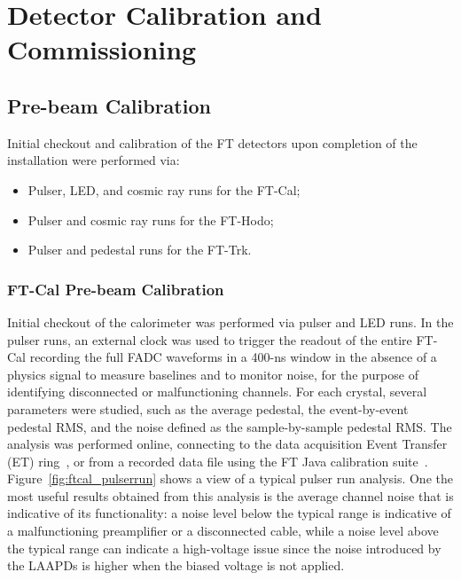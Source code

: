 \section{Detector Calibration and Commissioning}
\label{sec:calibration}

\subsection{Pre-beam Calibration}

Initial checkout and calibration of the FT detectors upon completion of the installation were performed via:
\begin{itemize}
    \item Pulser, LED, and cosmic ray runs for the FT-Cal;
    \item Pulser and cosmic ray runs for the FT-Hodo;
    \item Pulser and pedestal runs for the FT-Trk.
\end{itemize}

\subsubsection{FT-Cal Pre-beam Calibration}

Initial checkout of the calorimeter was performed via pulser and LED runs. In the pulser runs, an external clock was
used to trigger the readout of the entire FT-Cal recording the full FADC waveforms in a 400-ns window in the
absence of a physics signal to measure baselines and to monitor noise, for the purpose of identifying disconnected
or malfunctioning channels. For each crystal, several parameters were studied, such as the average pedestal, the
event-by-event pedestal RMS, and the noise defined as the sample-by-sample pedestal RMS. The analysis was
performed online, connecting to the data acquisition Event Transfer (ET) ring~\cite{daq}, or from a recorded
data file using the FT Java calibration suite~\cite{reconstruction}. Figure~\ref{fig:ftcal_pulserrun} shows a
view of a typical pulser run analysis. One the most useful results obtained from this analysis is the average channel
noise that is indicative of its functionality: a noise level below the typical range is indicative of a malfunctioning
preamplifier or a disconnected cable, while a noise level above the typical range can indicate a high-voltage issue
since the noise introduced by the LAAPDs is higher when the biased voltage is not applied. 

